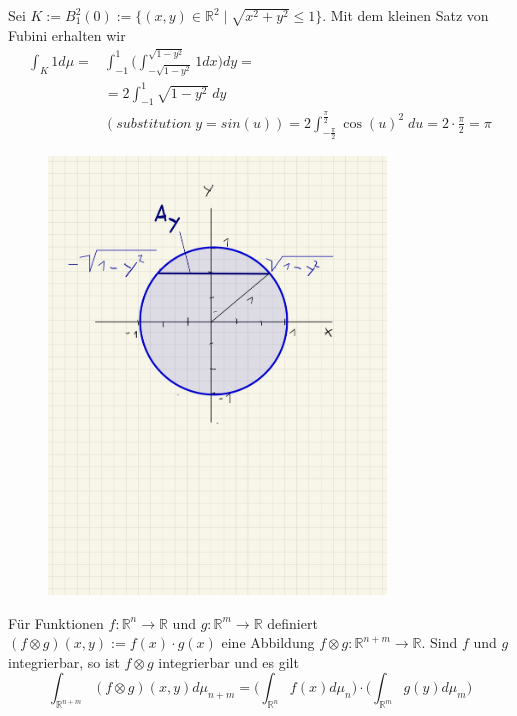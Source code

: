 \begin{Beispiel} 
Sei $K := B^2_1(0) := \{   (x,y) \in \mathbb{R}^2 \; | \; \sqrt{x^2 + y^2 } \leq 1\}$. Mit dem kleinen Satz von Fubini erhalten wir
\begin{align*}
\int_K 1 d \mu = &  \int_{-1}^{1} \biggl ( \int_{-\sqrt{1- y^2}}^{\sqrt{1- y^2}} 1 dx \biggr ) dy = \\ 
& =  2 \int_{-1}^{1}  \sqrt{1 - y^2}   \; dy  \\ 
 & (substitution \;   y = sin(u)) =   2 \int_{-\frac{\pi}{2}}^{\frac{\pi}{2}}   \cos(u)^2   \; du = 2 \cdot \frac{\pi}{2} = \pi
\end{align*}
\end{Beispiel}
\begin{figure}[H]
      \centering
    \includegraphics[width=0.8\textwidth]{images/Kreis}
\end{figure}




\begin{Satz}[Produktsatz]
Für Funktionen $f : \mathbb{R}^n \to \mathbb{R}$ und $g: \mathbb{R}^m \to \mathbb{R}$ definiert $(f \otimes g) (x,y) := f(x) \cdot g(x)$ eine Abbildung $f \otimes g : \mathbb{R}^{n+m} \to \mathbb{R}$. Sind $f$  und $g$ integrierbar, so ist $f \otimes g$ integrierbar und es gilt
$$ \int_{\mathbb{R}^{n+m} } (f \otimes g) (x,y) d \mu_{n+m} =  \biggl (    \int_{\mathbb{R}^{n} } f (x) d \mu_{n}  \biggr ) \cdot \biggl (    \int_{\mathbb{R}^{m} } g (y) d \mu_{m}  \biggr )$$
\end{Satz}

